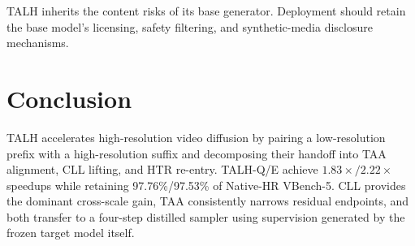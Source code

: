 TALH inherits the content risks of its base generator. Deployment should retain the base model's licensing, safety filtering, and synthetic-media disclosure mechanisms.

\section{Conclusion}

TALH accelerates high-resolution video diffusion by pairing a low-resolution prefix with a high-resolution suffix and decomposing their handoff into TAA alignment, CLL lifting, and HTR re-entry. TALH-Q/E achieve \(1.83\times/2.22\times\) speedups while retaining 97.76\%/97.53\% of Native-HR VBench-5. CLL provides the dominant cross-scale gain, TAA consistently narrows residual endpoints, and both transfer to a four-step distilled sampler using supervision generated by the frozen target model itself.
